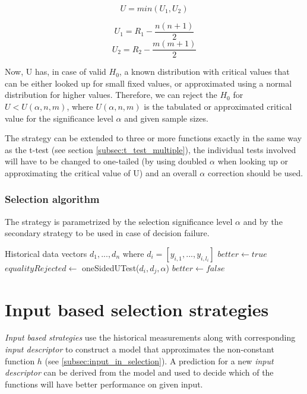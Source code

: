 \[U = min(U_1, U_2)\]

\[U_1 = R_1 - \frac{n(n+1)}{2}\]
\[U_2 = R_2 - \frac{m(m+1)}{2}\]

Now, U has, in case of valid $H_0$, a known distribution with critical values that can be either looked up for small fixed values, or approximated using a normal distribution for higher values. Therefore, we can reject the $H_0$ for \mbox{$U < U(\alpha, n, m)$}, where $U(\alpha, n, m)$ is the tabulated or approximated critical value for the significance level $\alpha$ and given sample sizes.

The strategy can be extended to three or more functions exactly in the same way as the t-test (see section \ref{subsec:t_test_multiple}), the individual tests involved will have to be changed to one-tailed (by using doubled $\alpha$ when looking up or approximating the critical value of U) and an overall $\alpha$ correction should be used.

\subsubsection{Selection algorithm}

The strategy is parametrized by the selection significance level $\alpha$ and by the secondary strategy to be used in case of decision failure.

\begin{algorithmic}[1] %
	\INPUT Historical data vectors $d_1,...,d_n$ where $d_i = [y_{i,1},...,y_{i,l_i}]$
	\State $better \gets true$
	\State $equalityRejected \gets$ oneSidedUTest($d_i, d_j, \alpha$)
	\State $better \gets false$
	\EndIf
	\EndFor
	\State {}
	\EndIf
	\EndFor
	\State {}
	
\end{algorithmic}

\section{Input based selection strategies}
\label{sec:input_based_strategies}

\textit{Input based strategies} use the historical measurements along with corresponding \textit{input descriptor} to construct a model that approximates the non-constant function $h$ (see \ref{subsec:input_in_selection}). A prediction for a new \textit{input descriptor} can be derived from the model and used to decide which of the functions will have better performance on given input.

